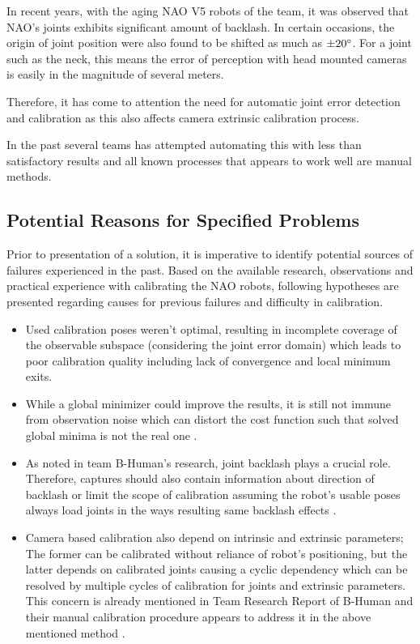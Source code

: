 \documentclass[english, printversion, nomenclature, notitle]{tuvisionthesis} %
\begin{document}
In recent years, with the aging NAO V5 robots of the team, it was observed that NAO's joints exhibits significant amount of backlash. In certain occasions, the origin of joint position were also found to be shifted as much as $\pm20\degree$. For a joint such as the neck, this means the error of perception with head mounted cameras is easily in the magnitude of several meters.

Therefore, it has come to attention the need for automatic joint error detection and calibration as this also affects camera extrinsic calibration process.

In the past several teams has attempted automating this with less than satisfactory results and all known processes that appears to work well are manual methods. 

\subsection{Potential Reasons for Specified Problems}
Prior to presentation of a solution, it is imperative to identify potential sources of failures experienced in the past. Based on the available research, observations and practical experience with calibrating the NAO robots, following hypotheses are presented regarding causes for previous failures and difficulty in calibration.

\begin{itemize}
	\label{itemize:possible_reasons}
	\item Used calibration poses weren't optimal, resulting in incomplete coverage of the observable subspace (considering the joint error domain) which leads to poor calibration quality including lack of convergence and local minimum exits.
	\item While a global minimizer could improve the results, it is still not immune from observation noise which can distort the cost function such that solved global minima is not the real one \cite{global-optim-noise, WU2015151U}.
	\item As noted in team B-Human's research, joint backlash plays a crucial role. Therefore, captures should also contain information about direction of backlash or limit the scope of calibration assuming the robot's usable poses always load joints in the ways resulting same backlash effects \cite{kastner_automatic_2015}.
	\item Camera based calibration also depend on intrinsic and extrinsic parameters; The former can be calibrated without reliance of robot's positioning, but the latter depends on calibrated joints causing a cyclic dependency which can be resolved by multiple cycles of calibration for joints and extrinsic parameters. This concern is already mentioned in Team Research Report of B-Human and their manual calibration procedure appears to address it in the above mentioned method \cite{thomas_rofer_b-human_2018}.
\end{itemize}
\end{document}
